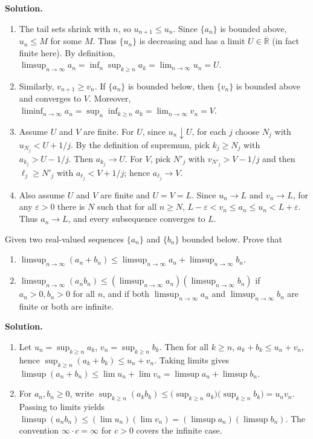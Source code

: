 \noindent\textbf{Solution.}
\begin{enumerate}[label=(\alph*)]
\item The tail sets shrink with \(n\), so \(u_{n+1}\le u_n\). Since \(\{a_n\}\) is bounded above, \(u_n\le M\) for some \(M\). Thus \(\{u_n\}\) is decreasing and has a limit \(U\in\overline{\mathbb{R}}\) (in fact finite here). By definition, \(\limsup_{n\to\infty} a_n=\inf_n \sup_{k\ge n} a_k=\lim_{n\to\infty} u_n=U\).
\item Similarly, \(v_{n+1}\ge v_n\). If \(\{a_n\}\) is bounded below, then \(\{v_n\}\) is bounded above and converges to \(V\). Moreover, \(\liminf_{n\to\infty} a_n=\sup_n \inf_{k\ge n} a_k=\lim_{n\to\infty} v_n=V\).
\item Assume \(U\) and \(V\) are finite. For \(U\), since \(u_n\downarrow U\), for each \(j\) choose \(N_j\) with \(u_{N_j}<U+1/j\). By the definition of supremum, pick \(k_j\ge N_j\) with \(a_{k_j}>U-1/j\). Then \(a_{k_j}\to U\). For \(V\), pick \(N'_j\) with \(v_{N'_j}>V-1/j\) and then \(\ell_j\ge N'_j\) with \(a_{\ell_j}<V+1/j\); hence \(a_{\ell_j}\to V\).
\item Also assume \(U\) and \(V\) are finite and \(U=V=L\). Since \(u_n\to L\) and \(v_n\to L\), for any \(\varepsilon>0\) there is \(N\) such that for all \(n\ge N\), \(L-\varepsilon<v_n\le a_n\le u_n<L+\varepsilon\). Thus \(a_n\to L\), and every subsequence converges to \(L\).
\end{enumerate}



\begin{problembox}
Given two real-valued sequences \(\{a_n\}\) and \(\{b_n\}\) bounded below. Prove that
\begin{enumerate}[label=\alph*)]
\item \(\limsup_{n \to \infty} (a_n + b_n) \leq \limsup_{n \to \infty} a_n + \limsup_{n \to \infty} b_n\).
\item \(\limsup_{n \to \infty} (a_n b_n) \leq (\limsup_{n \to \infty} a_n)(\limsup_{n \to \infty} b_n)\) if \(a_n > 0, b_n > 0\) for all \(n\), and if both \(\limsup_{n \to \infty} a_n\) and \(\limsup_{n \to \infty} b_n\) are finite or both are infinite.
\end{enumerate}
\end{problembox}

\noindent\textbf{Solution.}
\begin{enumerate}[label=(\alph*)]
\item Let \(u_n=\sup_{k\ge n} a_k\), \(v_n=\sup_{k\ge n} b_k\). Then for all \(k\ge n\), \(a_k+b_k\le u_n+v_n\), hence \(\sup_{k\ge n}(a_k+b_k)\le u_n+v_n\). Taking limits gives \(\limsup(a_n+b_n)\le \lim u_n+\lim v_n=\limsup a_n+\limsup b_n\).
\item For \(a_n,b_n\ge 0\), write \(\sup_{k\ge n}(a_k b_k)\le \big(\sup_{k\ge n} a_k\big)\big(\sup_{k\ge n} b_k\big)=u_n v_n\). Passing to limits yields \(\limsup(a_n b_n)\le (\lim u_n)(\lim v_n)=(\limsup a_n)(\limsup b_n)\). The convention \(\infty\cdot c=\infty\) for \(c>0\) covers the infinite case.
\end{enumerate}

